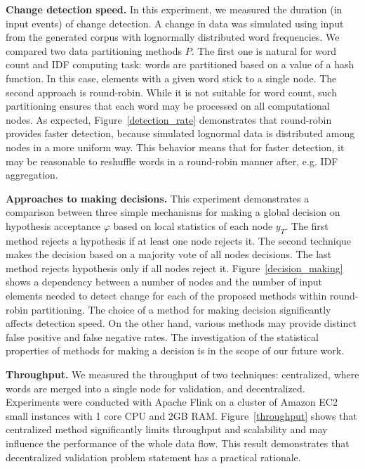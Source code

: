 {\bf Change detection speed.} In this experiment, we measured the duration (in input events) of change detection. A change in data was simulated using input from the generated corpus with lognormally distributed word frequencies. We compared two data partitioning methods $P$. The first one is natural for word count and IDF computing task: words are partitioned based on a value of a hash function. In this case, elements with a given word stick to a single node. The second approach is round-robin. While it is not suitable for word count, such partitioning ensures that each word may be processed on all computational nodes. As expected, Figure~\ref{detection_rate} demonstrates that round-robin provides faster detection, because simulated lognormal data is distributed among nodes in a more uniform way. This behavior means that for faster detection, it may be reasonable to reshuffle words in a round-robin manner after, e.g. IDF aggregation.

{\bf Approaches to making decisions.} This experiment demonstrates a comparison between three simple mechanisms for making a global decision on hypothesis acceptance $\varphi$ based on local statistics of each node $y_T$. The first method rejects a hypothesis if at least one node rejects it. The second technique makes the decision based on a majority vote of all nodes decisions. The last method rejects hypothesis only if all nodes reject it. Figure~\ref{decision_making} shows a dependency between a number of nodes and the number of input elements needed to detect change for each of the proposed methods within round-robin partitioning. The choice of a method for making decision significantly affects detection speed. On the other hand, various methods may provide distinct false positive and false negative rates. The investigation of the statistical properties of methods for making a decision is in the scope of our future work.

{\bf Throughput.} We measured the throughput of two techniques: centralized, where words are merged into a single node for validation, and decentralized. Experiments were conducted with Apache Flink on a cluster of Amazon EC2 small instances with 1 core CPU and 2GB RAM. Figure~\ref{throughput} shows that centralized method significantly limits throughput and scalability and may influence the performance of the whole data flow. This result demonstrates that decentralized validation problem statement has a practical rationale.